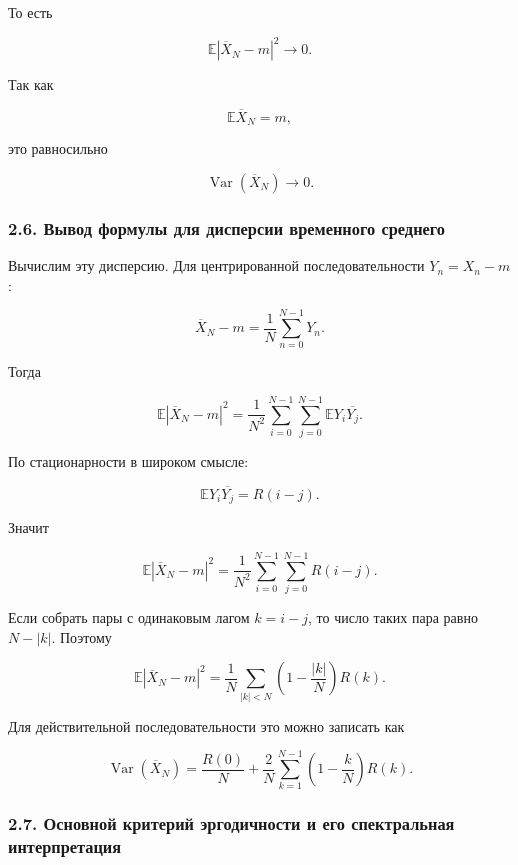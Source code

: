 \documentclass[
  11pt,
  a4paper,
]{article}
\begin{document}
То есть

\[
\mathbb E|\overline X_N-m|^2\to0.
\]

Так как

\[
\mathbb E\overline X_N=m,
\]

это равносильно

\[
\operatorname{Var}(\overline X_N)\to0.
\]

\subsubsection{2.6. Вывод формулы для дисперсии временного
среднего}\label{ux432ux44bux432ux43eux434-ux444ux43eux440ux43cux443ux43bux44b-ux434ux43bux44f-ux434ux438ux441ux43fux435ux440ux441ux438ux438-ux432ux440ux435ux43cux435ux43dux43dux43eux433ux43e-ux441ux440ux435ux434ux43dux435ux433ux43e}

Вычислим эту дисперсию. Для центрированной последовательности
\(Y_n=X_n-m\):

\[
\overline X_N-m
=
\frac1N\sum_{n=0}^{N-1}Y_n.
\]

Тогда

\[
\mathbb E|\overline X_N-m|^2
=
\frac1{N^2}
\sum_{i=0}^{N-1}\sum_{j=0}^{N-1}
\mathbb E Y_i\overline{Y_j}.
\]

По стационарности в широком смысле:

\[
\mathbb E Y_i\overline{Y_j}=R(i-j).
\]

Значит

\[
\mathbb E|\overline X_N-m|^2
=
\frac1{N^2}
\sum_{i=0}^{N-1}\sum_{j=0}^{N-1}R(i-j).
\]

Если собрать пары с одинаковым лагом \(k=i-j\), то число таких пара
равно \(N-|k|\). Поэтому

\[
\mathbb E|\overline X_N-m|^2
=
\frac1N
\sum_{|k|<N}
\left(1-\frac{|k|}{N}\right)R(k).
\]

Для действительной последовательности это можно записать как

\[
\operatorname{Var}(\overline X_N)
=
\frac{R(0)}{N}
+
\frac{2}{N}
\sum_{k=1}^{N-1}
\left(1-\frac{k}{N}\right)R(k).
\]

\subsubsection{2.7. Основной критерий эргодичности и его спектральная
интерпретация}\label{ux43eux441ux43dux43eux432ux43dux43eux439-ux43aux440ux438ux442ux435ux440ux438ux439-ux44dux440ux433ux43eux434ux438ux447ux43dux43eux441ux442ux438-ux438-ux435ux433ux43e-ux441ux43fux435ux43aux442ux440ux430ux43bux44cux43dux430ux44f-ux438ux43dux442ux435ux440ux43fux440ux435ux442ux430ux446ux438ux44f}
\end{document}
